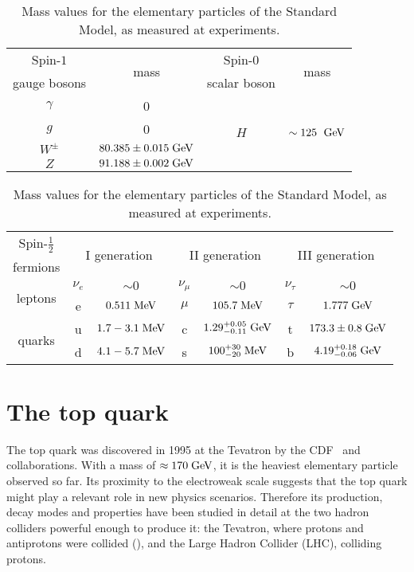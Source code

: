 \begin{table}\centering
  \begin{tabular}{cccc}\toprule
    Spin-$1$ & \multirow{2}{*}{mass} & Spin-0 & \multirow{2}{*}{mass}\\
    gauge bosons & & scalar boson & \\\midrule
    $\gamma$      & 0  & \multirow{4}{*}{$H$} & \multirow{4}{*}{$\sim 125~\; \mathrm{GeV}$}                        \\
    $g$           & 0  & &                        \\
    $W^{\pm}$ & $ 80.385 \pm 0.015 \; \mathrm{GeV}$ & &\\
    $Z$       & $ 91.188 \pm 0.002 \; \mathrm{GeV}$ & &\\\bottomrule
  \end{tabular}
  \begin{tabular}{ccccccc}\toprule
    Spin-$\tfrac{1}{2}$ &  \multicolumn{2}{c}{\multirow{2}{*}{I generation}}
    &  \multicolumn{2}{c}{\multirow{2}{*}{II generation}}
    &  \multicolumn{2}{c}{\multirow{2}{*}{III generation}}\\
    fermions & & & & & \\\midrule
    \multirow{2}{*}{leptons} &
    $\nu_{e}$   & \small{$\sim 0$} &  
    $\nu_{\mu}$ & \small{$\sim 0$} &  
    $\nu_{\tau}$ & \small{$\sim 0$} \\
    &
    e            & \small{$0.511\; \mathrm{MeV}$}   &  
    $\mu$ & \small{$105.7\; \mathrm{MeV}$} &  
    $\tau$     & \small{$1.777\; \mathrm{GeV}$} \\
    \multirow{2}{*}{quarks} &
    u & \small{$1.7-3.1\; \mathrm{MeV}$}         &  
    c & \small{$1.29^{+0.05}_{-0.11}\; \mathrm{GeV}$}  &  
    t & \small{$173.3\pm0.8\; \mathrm{GeV}$}\\
    &
    d & \small{$4.1-5.7\; \mathrm{MeV}$} &  
    s & \small{$100^{+30}_{-20}\; \mathrm{MeV}$} &  
    b & \small{$4.19^{+0.18}_{-0.06}\; \mathrm{GeV}$} \\\bottomrule
  \end{tabular}
  \caption{Mass values for the elementary particles of the Standard
    Model, as measured at experiments.\label{tab:smmasses}}
\end{table}
 
\section{The top quark}
\label{sec:topquark}

The top quark was discovered in 1995 at the Tevatron by the
CDF~\cite{topcdf} and \dzero{}~\cite{topdzero} collaborations. With a
mass of $\approx{}170\; \mathrm{GeV}{}$, it is the heaviest elementary particle
observed so far. Its proximity to the electroweak scale suggests that
the top quark might play a relevant role in new physics
scenarios. Therefore its production, decay modes and properties have
been studied in detail at the two hadron colliders powerful 
enough to produce it: the Tevatron, where protons and antiprotons were
collided (\ppbar{}), and the Large Hadron Collider (LHC), colliding protons.

